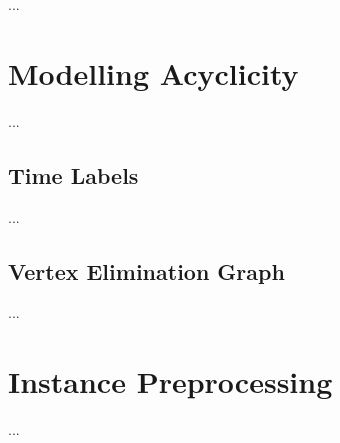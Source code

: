 ...

\section{Modelling Acyclicity}
...

\subsection{Time Labels}
...

\subsection{Vertex Elimination Graph}
...

\section{Instance Preprocessing}
...
